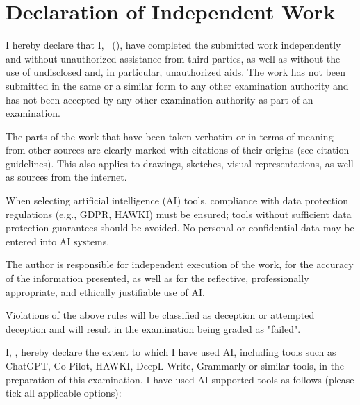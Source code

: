 \pagestyle{empty} 
\chapter*{Declaration of Independent Work}
\thispagestyle{empty} 

I hereby declare that I, \Author\ (\MatriculationNumber), have completed the submitted work independently and without unauthorized assistance from third parties, as well as without the use of undisclosed and, in particular, unauthorized aids. The work has not been submitted in the same or a similar form to any other examination authority and has not been accepted by any other examination authority as part of an examination.

The parts of the work that have been taken verbatim or in terms of meaning from other sources are clearly marked with citations of their origins (see citation guidelines). This also applies to drawings, sketches, visual representations, as well as sources from the internet.

When selecting artificial intelligence (AI) tools, compliance with data protection regulations (e.g., GDPR, HAWKI) must be ensured; tools without sufficient data protection guarantees should be avoided. No personal or confidential data may be entered into AI systems.

The author is responsible for independent execution of the work, for the accuracy of the information presented, as well as for the reflective, professionally appropriate, and ethically justifiable use of AI.

Violations of the above rules will be classified as deception or attempted deception and will result in the examination being graded as "failed".

I, \Author, hereby declare the extent to which I have used AI, including tools such as ChatGPT, Co-Pilot, HAWKI, DeepL Write, Grammarly or similar tools, in the preparation of this examination. I have used AI-supported tools as follows (please tick all applicable options):

